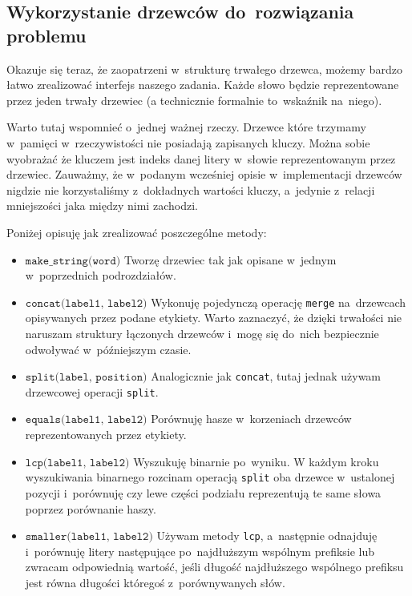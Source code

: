 \documentclass[declaration,shortabstract]{iithesis}
\theoremstyle{definition} \newtheorem{definition}{Definicja}[chapter]
\theoremstyle{plain} \newtheorem{remark}[definition]{Obserwacja}
\theoremstyle{plain} \newtheorem{theorem}[definition]{Twierdzenie}
\theoremstyle{plain} \newtheorem{example}{Przykład}[definition]
\theoremstyle{plain} \newtheorem{lemma}[definition]{Lemat}
\begin{document}
\subsection{Wykorzystanie drzewców do~rozwiązania problemu}

Okazuje się teraz, że zaopatrzeni w~strukturę trwałego drzewca, możemy bardzo łatwo zrealizować interfejs naszego zadania. Każde słowo będzie reprezentowane przez jeden trwały drzewiec (a technicznie formalnie to~wskaźnik na~niego). 

Warto tutaj wspomnieć o~jednej ważnej rzeczy. Drzewce które trzymamy w~pamięci w~rzeczywistości nie posiadają zapisanych kluczy. Można sobie wyobrażać że kluczem jest indeks danej litery w~słowie reprezentowanym przez drzewiec. Zauważmy, że w~podanym wcześniej opisie w~implementacji drzewców nigdzie nie korzystaliśmy z~dokładnych wartości kluczy, a~jedynie z~relacji mniejszości jaka między nimi zachodzi.

Poniżej opisuję jak zrealizować poszczególne metody:
\begin{itemize}
    \item $\texttt{make\_string(word)}$ Tworzę drzewiec tak jak opisane w~jednym w~poprzednich podrozdziałów.
    \item $\texttt{concat(label1, label2)}$ Wykonuję pojedynczą operację \texttt{merge} na~drzewcach opisywanych przez podane etykiety. Warto zaznaczyć, że dzięki trwałości nie naruszam struktury łączonych drzewców i~mogę się do~nich bezpiecznie odwoływać w~późniejszym czasie.
    \item $\texttt{split(label, position)}$ Analogicznie jak \texttt{concat}, tutaj jednak używam drzewcowej operacji \texttt{split}.
    \item $\texttt{equals(label1, label2)}$ Porównuję hasze w~korzeniach drzewców reprezentowanych przez etykiety.
    \item $\texttt{lcp(label1, label2)}$ Wyszukuję binarnie po~wyniku. W każdym kroku wyszukiwania binarnego rozcinam operacją \texttt{split} oba drzewce w~ustalonej pozycji i~porównuję czy lewe części podziału reprezentują te same słowa poprzez porównanie haszy.
    \item $\texttt{smaller(label1, label2)}$ Używam metody \texttt{lcp}, a~następnie odnajduję i~porównuję litery następujące po~najdłuższym wspólnym prefiksie lub zwracam odpowiednią wartość, jeśli długość najdłuższego wspólnego prefiksu jest równa długości któregoś z~porównywanych słów.
\end{itemize}
\end{document}
